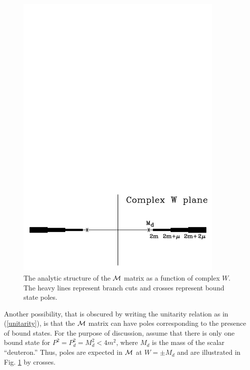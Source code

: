 \documentclass[mythesis.tex]{subfiles}
\begin{document}
\begin{figure}
\centerline{\includegraphics[width=4in]{graphics/new/analytic.pdf}}
\caption{The analytic structure of the $\cal M$ matrix as a
function of complex $W$. The heavy lines represent branch cuts and
crosses represent bound state poles.}\label{analyticM}
\end{figure}
%
Another possibility, that is obscured by writing the unitarity relation as
in (\ref{unitarity}), is that the $\cal M$ matrix can have poles
corresponding to the presence of bound states. For the purpose of
discussion, assume that there is only one bound state for
$P^2=P_d^2=M_d^2<4 m^2$, where $M_d$ is the mass of the scalar ``deuteron.''
Thus, poles are expected in $\cal M$ at $W=\pm M_d$ and are illustrated in
Fig. \ref{analyticM} by crosses.
\end{document}
